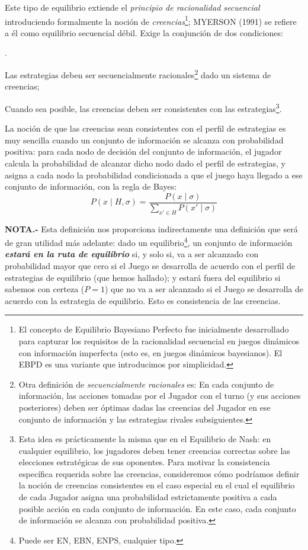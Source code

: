 \documentclass[10pt,a4paper]{article}
\newcounter{numitem}
\newenvironment{lnum}
      {\begin{list}{\arabic{numitem}.}{%
          \usecounter{numitem}%
          \setlength{\leftmargin}{1cm}%
          \setlength{\parskip}{3pt}%
          \setlength{\itemsep}{0pt}%
          \setlength{\parsep}{0pt}%
      }}
      {\end{list}}
\begin{document}
Este tipo de equilibrio extiende el \textit{principio de racionalidad secuencial} introduciendo formalmente la noción de \textit{creencias}\footnote{%
    El concepto de Equilibrio Bayesiano Perfecto fue inicialmente desarrollado para capturar los requisitos de la racionalidad secuencial en juegos dinámicos con información imperfecta (esto es, en juegos dinámicos bayesianos). El EBPD es una variante que introducimos por simplicidad.
}; MYERSON (1991) se refiere a él como equilibrio secuencial débil. Exige la conjunción de dos condiciones:

\begin{lnum}
    \item Las estrategias deben ser secuencialmente racionales\footnote{%
    Otra definición de \textit{secuencialmente racionales} es: En cada conjunto de información, las acciones tomadas por el Jugador con el turno (y sus acciones posteriores) deben ser óptimas dadas las creencias del Jugador en ese conjunto de información y las estrategias rivales subsiguientes.
} dado un sistema de creencias;
    \item Cuando sea posible, las creencias deben ser consistentes con las estrategias\footnote{%
    Esta idea es prácticamente la misma que en el Equilibrio de Nash: en cualquier equilibrio, los jugadores deben tener creencias correctas sobre las elecciones estratégicas de sus oponentes. Para motivar la consistencia específica requerida sobre las creencias, consideremos cómo podríamos definir la noción de creencias consistentes en el caso especial en el cual el equilibrio de cada Jugador asigna una probabilidad estrictamente positiva a cada posible acción en cada conjunto de información. En este caso, cada conjunto de información se alcanza con probabilidad positiva.
}.
\end{lnum}

La noción de que las creencias sean consistentes con el perfil de estrategias es muy sencilla cuando un conjunto de información se alcanza con probabilidad positiva: para cada nodo de decisión del conjunto de información, el jugador calcula la probabilidad de alcanzar dicho nodo dado el perfil de estrategias, y asigna a cada nodo la probabilidad condicionada a que el juego haya llegado a ese conjunto de información, con la regla de Bayes:
$$P(x\mid H,\sigma)=\frac{P(x\mid\sigma)}{\sum_{x'\in H}P(x'\mid\sigma)}$$

\textbf{NOTA.-} Esta definición nos proporciona indirectamente una definición que será de gran utilidad más adelante: dado un equilibrio\footnote{%
    Puede ser EN, EBN, ENPS, cualquier tipo.
}, un conjunto de información \textbf{\textit{estará en la ruta de equilibrio}} si, y solo si, va a ser alcanzado con probabilidad mayor que cero si el Juego se desarrolla de acuerdo con el perfil de estrategias de equilibrio (que hemos hallado); y estará fuera del equilibrio si sabemos con certeza ($P=1$) que no va a ser alcanzado si el Juego se desarrolla de acuerdo con la estrategia de equilibrio. Esto es consistencia de las creencias.
\end{document}
